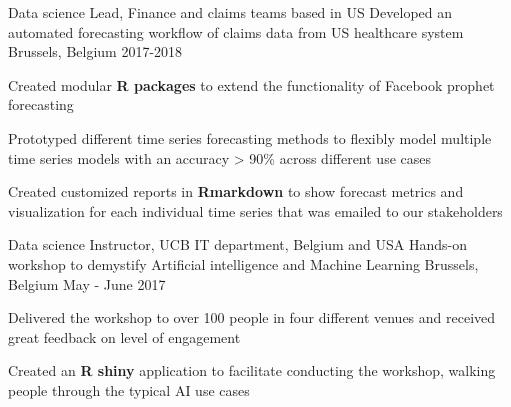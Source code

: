 \begin{cventries}
    \cventry
    {Data science Lead, Finance and claims teams based in US} %
    {Developed an automated forecasting workflow of claims data from US healthcare system} %
    {Brussels, Belgium} %
    {2017-2018} %
    {
    \begin{cvitems}
        \item Created modular \textbf{R packages} to extend the functionality of Facebook prophet forecasting
        \item Prototyped different time series forecasting methods to flexibly model multiple time series models with an accuracy > 90\% across different use cases
        \item Created customized reports in \textbf{Rmarkdown} to show forecast metrics and visualization for each individual time series that was emailed to our stakeholders
    \end{cvitems}
    }

    \vspace{2mm}
        
    \cventry
    {Data science Instructor, UCB IT department, Belgium and USA} %
    {Hands-on workshop to demystify Artificial intelligence and Machine Learning} %
    {Brussels, Belgium} %
    {May - June 2017} %
    {
        \begin{cvitems}
        \item Delivered the workshop to over 100 people in four different venues and received great feedback on level of engagement
        \item Created an \textbf{R shiny} application to facilitate conducting the workshop, walking people through the typical AI use cases
    \end{cvitems}
    }

\end{cventries}


